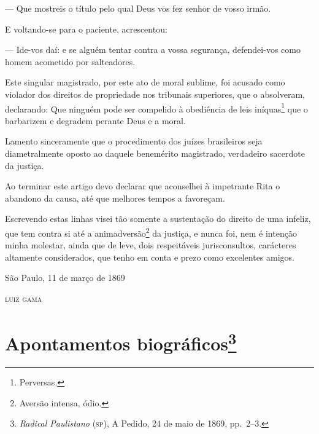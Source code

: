 --- Que mostreis o título pelo qual Deus vos fez senhor de vosso irmão.

E voltando-se para o paciente, acrescentou:

--- Ide-vos daí: e se alguém tentar contra a vossa segurança,
defendei-vos como homem acometido por salteadores.

Este singular magistrado, por este ato de moral sublime, foi acusado
como violador dos direitos de propriedade nos tribunais superiores, que
o absolveram, declarando: Que ninguém pode ser compelido à obediência de
leis iníquas\footnote{Perversas.} que o barbarizem e degradem perante
Deus e a moral.

Lamento sinceramente que o procedimento dos juízes brasileiros seja
diametralmente oposto ao daquele benemérito magistrado, verdadeiro
sacerdote da justiça.

Ao terminar este artigo devo declarar que aconselhei à impetrante Rita o
abandono da causa, até que melhores tempos a favoreçam.

Escrevendo estas linhas visei tão somente a sustentação do direito de
uma infeliz, que tem contra si até a animadversão\footnote{Aversão
  intensa, ódio.} da justiça, e nunca foi, nem é intenção minha
molestar, ainda que de leve, dois respeitáveis jurisconsultos,
carácteres altamente considerados, que tenho em conta e prezo como
excelentes amigos.

\begin{flushright}
São Paulo, 11 de março de 1869

\textsc{luiz gama}
\end{flushright}

\chapter{Apontamentos biográficos\footnote{\emph{Radical Paulistano}
  (\textsc{sp}), A Pedido, 24 de maio de 1869, pp.~2--3.}}

